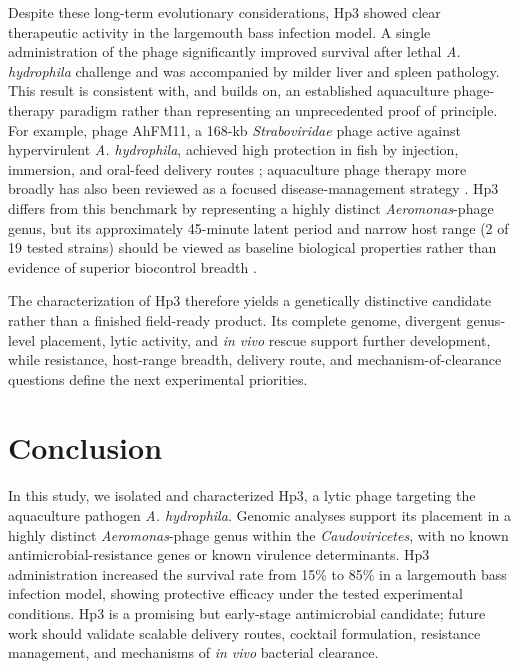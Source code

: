 Despite these long-term evolutionary considerations, Hp3 showed clear
therapeutic activity in the largemouth bass infection model. A single
administration of the phage significantly improved survival after lethal
\emph{A. hydrophila} challenge and was accompanied by milder liver and
spleen pathology. This result is consistent with, and builds on, an
established aquaculture phage-therapy paradigm rather than representing
an unprecedented proof of principle. For example, phage AhFM11, a
168-kb \emph{Straboviridae} phage active against hypervirulent
\emph{A. hydrophila}, achieved high protection in fish by injection,
immersion, and oral-feed delivery routes \citep{2024-Novel_MuliyaSankappa};
aquaculture phage therapy more broadly has also been reviewed as a
focused disease-management strategy \citep{2021-Phage_Ramos-Vivas}.
Hp3 differs from this benchmark by representing a highly distinct
\emph{Aeromonas}-phage genus, but its approximately 45-minute latent
period and narrow host range (2 of 19 tested strains) should be viewed
as baseline biological properties rather than evidence of superior
biocontrol breadth \citep{2022-Characterization_Bujak,
2024-Novel_MuliyaSankappa}.

The characterization of Hp3 therefore yields a genetically distinctive
candidate rather than a finished field-ready product. Its complete
genome, divergent genus-level placement, lytic activity, and \emph{in vivo}
rescue support further development, while resistance, host-range breadth,
delivery route, and mechanism-of-clearance questions define the next
experimental priorities.

\section{Conclusion}\label{conclusion}

In this study, we isolated and characterized Hp3, a lytic phage targeting
the aquaculture pathogen \emph{A. hydrophila}. Genomic analyses support
its placement in a highly distinct \emph{Aeromonas}-phage genus within
the \emph{Caudoviricetes}, with no known antimicrobial-resistance genes
or known virulence determinants. Hp3 administration increased
the survival rate from 15\% to 85\% in a largemouth bass infection
model, showing protective efficacy under the tested experimental
conditions. Hp3 is a promising but early-stage
antimicrobial candidate; future work should validate scalable delivery
routes, cocktail formulation, resistance management, and mechanisms of
\emph{in vivo} bacterial clearance.

